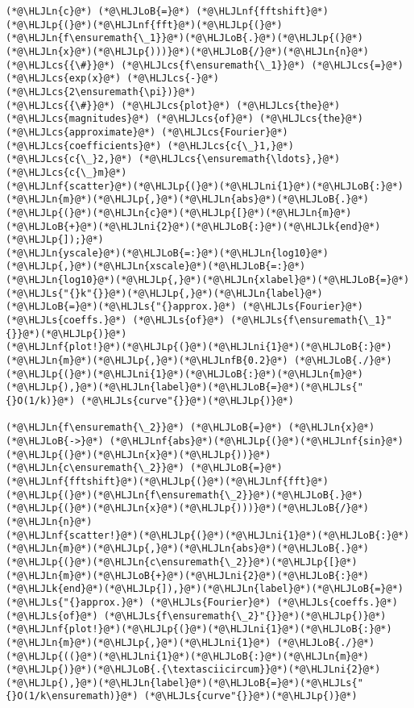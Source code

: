 \documentclass[12pt,landscape]{article}
\newcommand{\HLJLk}[1]{\textcolor[RGB]{148,91,176}{\textbf{#1}}}
\newcommand{\HLJLn}[1]{#1}
\newcommand{\HLJLnf}[1]{\textcolor[RGB]{66,102,213}{#1}}
\newcommand{\HLJLs}[1]{\textcolor[RGB]{201,61,57}{#1}}
\newcommand{\HLJLnfB}[1]{\textcolor[RGB]{59,151,46}{#1}}
\newcommand{\HLJLni}[1]{\textcolor[RGB]{59,151,46}{#1}}
\newcommand{\HLJLoB}[1]{\textcolor[RGB]{102,102,102}{\textbf{#1}}}
\newcommand{\HLJLp}[1]{#1}
\newcommand{\HLJLcs}[1]{\textcolor[RGB]{153,153,119}{\textit{#1}}}
\begin{document}
{\begin{lstlisting}
(*@\HLJLn{c}@*) (*@\HLJLoB{=}@*) (*@\HLJLnf{fftshift}@*)(*@\HLJLp{(}@*)(*@\HLJLnf{fft}@*)(*@\HLJLp{(}@*)(*@\HLJLn{f\ensuremath{\_1}}@*)(*@\HLJLoB{.}@*)(*@\HLJLp{(}@*)(*@\HLJLn{x}@*)(*@\HLJLp{)))}@*)(*@\HLJLoB{/}@*)(*@\HLJLn{n}@*)   (*@\HLJLcs{{\#}}@*) (*@\HLJLcs{f\ensuremath{\_1}}@*) (*@\HLJLcs{=}@*) (*@\HLJLcs{exp(x}@*) (*@\HLJLcs{-}@*) (*@\HLJLcs{2\ensuremath{\pi})}@*)
(*@\HLJLcs{{\#}}@*) (*@\HLJLcs{plot}@*) (*@\HLJLcs{the}@*) (*@\HLJLcs{magnitudes}@*) (*@\HLJLcs{of}@*) (*@\HLJLcs{the}@*) (*@\HLJLcs{approximate}@*) (*@\HLJLcs{Fourier}@*) (*@\HLJLcs{coefficients}@*) (*@\HLJLcs{c{\_}1,}@*) (*@\HLJLcs{c{\_}2,}@*) (*@\HLJLcs{\ensuremath{\ldots},}@*) (*@\HLJLcs{c{\_}m}@*) 
(*@\HLJLnf{scatter}@*)(*@\HLJLp{(}@*)(*@\HLJLni{1}@*)(*@\HLJLoB{:}@*)(*@\HLJLn{m}@*)(*@\HLJLp{,}@*)(*@\HLJLn{abs}@*)(*@\HLJLoB{.}@*)(*@\HLJLp{(}@*)(*@\HLJLn{c}@*)(*@\HLJLp{[}@*)(*@\HLJLn{m}@*)(*@\HLJLoB{+}@*)(*@\HLJLni{2}@*)(*@\HLJLoB{:}@*)(*@\HLJLk{end}@*)(*@\HLJLp{]);}@*) 
(*@\HLJLn{yscale}@*)(*@\HLJLoB{=:}@*)(*@\HLJLn{log10}@*)(*@\HLJLp{,}@*)(*@\HLJLn{xscale}@*)(*@\HLJLoB{=:}@*)(*@\HLJLn{log10}@*)(*@\HLJLp{,}@*)(*@\HLJLn{xlabel}@*)(*@\HLJLoB{=}@*)(*@\HLJLs{"{}k"{}}@*)(*@\HLJLp{,}@*)(*@\HLJLn{label}@*)(*@\HLJLoB{=}@*)(*@\HLJLs{"{}approx.}@*) (*@\HLJLs{Fourier}@*) (*@\HLJLs{coeffs.}@*) (*@\HLJLs{of}@*) (*@\HLJLs{f\ensuremath{\_1}"{}}@*)(*@\HLJLp{)}@*)
(*@\HLJLnf{plot!}@*)(*@\HLJLp{(}@*)(*@\HLJLni{1}@*)(*@\HLJLoB{:}@*)(*@\HLJLn{m}@*)(*@\HLJLp{,}@*)(*@\HLJLnfB{0.2}@*) (*@\HLJLoB{./}@*)(*@\HLJLp{(}@*)(*@\HLJLni{1}@*)(*@\HLJLoB{:}@*)(*@\HLJLn{m}@*)(*@\HLJLp{),}@*)(*@\HLJLn{label}@*)(*@\HLJLoB{=}@*)(*@\HLJLs{"{}O(1/k)}@*) (*@\HLJLs{curve"{}}@*)(*@\HLJLp{)}@*)

(*@\HLJLn{f\ensuremath{\_2}}@*) (*@\HLJLoB{=}@*) (*@\HLJLn{x}@*) (*@\HLJLoB{->}@*) (*@\HLJLnf{abs}@*)(*@\HLJLp{(}@*)(*@\HLJLnf{sin}@*)(*@\HLJLp{(}@*)(*@\HLJLn{x}@*)(*@\HLJLp{))}@*)
(*@\HLJLn{c\ensuremath{\_2}}@*) (*@\HLJLoB{=}@*) (*@\HLJLnf{fftshift}@*)(*@\HLJLp{(}@*)(*@\HLJLnf{fft}@*)(*@\HLJLp{(}@*)(*@\HLJLn{f\ensuremath{\_2}}@*)(*@\HLJLoB{.}@*)(*@\HLJLp{(}@*)(*@\HLJLn{x}@*)(*@\HLJLp{)))}@*)(*@\HLJLoB{/}@*)(*@\HLJLn{n}@*)
(*@\HLJLnf{scatter!}@*)(*@\HLJLp{(}@*)(*@\HLJLni{1}@*)(*@\HLJLoB{:}@*)(*@\HLJLn{m}@*)(*@\HLJLp{,}@*)(*@\HLJLn{abs}@*)(*@\HLJLoB{.}@*)(*@\HLJLp{(}@*)(*@\HLJLn{c\ensuremath{\_2}}@*)(*@\HLJLp{[}@*)(*@\HLJLn{m}@*)(*@\HLJLoB{+}@*)(*@\HLJLni{2}@*)(*@\HLJLoB{:}@*)(*@\HLJLk{end}@*)(*@\HLJLp{]),}@*)(*@\HLJLn{label}@*)(*@\HLJLoB{=}@*)(*@\HLJLs{"{}approx.}@*) (*@\HLJLs{Fourier}@*) (*@\HLJLs{coeffs.}@*) (*@\HLJLs{of}@*) (*@\HLJLs{f\ensuremath{\_2}"{}}@*)(*@\HLJLp{)}@*)
(*@\HLJLnf{plot!}@*)(*@\HLJLp{(}@*)(*@\HLJLni{1}@*)(*@\HLJLoB{:}@*)(*@\HLJLn{m}@*)(*@\HLJLp{,}@*)(*@\HLJLni{1}@*) (*@\HLJLoB{./}@*)(*@\HLJLp{((}@*)(*@\HLJLni{1}@*)(*@\HLJLoB{:}@*)(*@\HLJLn{m}@*)(*@\HLJLp{)}@*)(*@\HLJLoB{.{\textasciicircum}}@*)(*@\HLJLni{2}@*)(*@\HLJLp{),}@*)(*@\HLJLn{label}@*)(*@\HLJLoB{=}@*)(*@\HLJLs{"{}O(1/k\ensuremath)}@*) (*@\HLJLs{curve"{}}@*)(*@\HLJLp{)}@*)


\end{lstlisting}}
\end{document}
